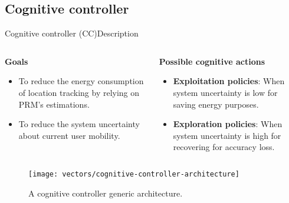 \subsection{Cognitive controller}
\begin{frame}{Cognitive controller (CC)}{Description}
\small
\vspace{-0.5cm}
\begin{columns}
\begin{column}[T]{0.5\textwidth}
\begin{block}{\small \textbf{Goals}}
  \begin{itemize}
      \item To reduce the energy consumption of location tracking by relying on PRM's estimations.
      \item To reduce the system uncertainty about current user mobility.
  \end{itemize}
\end{block}
\end{column}

\begin{column}[T]{0.5\textwidth}
\begin{block}{\small \textbf{Possible cognitive actions}}
  \begin{itemize}
    \item \textbf{Exploitation policies}: When system uncertainty is low for saving energy purposes.
    \item \textbf{Exploration policies}: When system uncertainty is high for recovering for accuracy loss.
  \end{itemize}
\end{block}
\end{column}
\end{columns}

\begin{figure}
  \centering
  \texttt{[image: vectors/cognitive-controller-architecture]}
  \caption{A cognitive controller generic architecture.}
\end{figure}

\end{frame}

